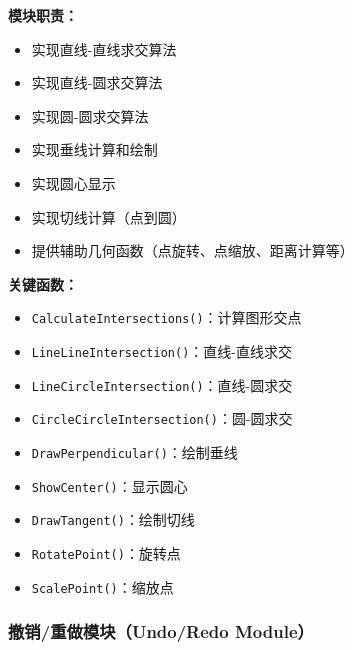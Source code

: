 \documentclass[12pt,a4paper]{article}
\begin{document}
\begin{tcolorbox}
\textbf{模块职责：}
\begin{itemize}
    \item 实现直线-直线求交算法
    \item 实现直线-圆求交算法
    \item 实现圆-圆求交算法
    \item 实现垂线计算和绘制
    \item 实现圆心显示
    \item 实现切线计算（点到圆）
    \item 提供辅助几何函数（点旋转、点缩放、距离计算等）
\end{itemize}

\textbf{关键函数：}
\begin{itemize}
    \item \texttt{CalculateIntersections()}：计算图形交点
    \item \texttt{LineLineIntersection()}：直线-直线求交
    \item \texttt{LineCircleIntersection()}：直线-圆求交
    \item \texttt{CircleCircleIntersection()}：圆-圆求交
    \item \texttt{DrawPerpendicular()}：绘制垂线
    \item \texttt{ShowCenter()}：显示圆心
    \item \texttt{DrawTangent()}：绘制切线
    \item \texttt{RotatePoint()}：旋转点
    \item \texttt{ScalePoint()}：缩放点
\end{itemize}
\end{tcolorbox}

\subsubsection{撤销/重做模块（Undo/Redo Module）}
\end{document}
